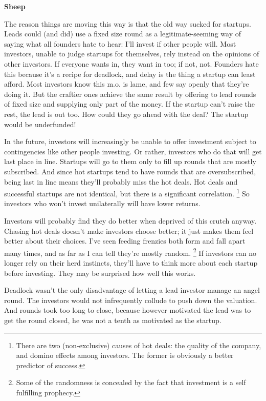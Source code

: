 \textbf{Sheep}

The reason things are moving this way is that the old way sucked for
startups. Leads could (and did) use a fixed size round as a
legitimate-seeming way of saying what all founders hate to hear: I'll
invest if other people will. Most investors, unable to judge startups
for themselves, rely instead on the opinions of other investors. If
everyone wants in, they want in too; if not, not. Founders hate this
because it's a recipe for deadlock, and delay is the thing a startup can
least afford. Most investors know this m.o. is lame, and few say openly
that they're doing it. But the craftier ones achieve the same result by
offering to lead rounds of fixed size and supplying only part of the
money. If the startup can't raise the rest, the lead is out too. How
could they go ahead with the deal? The startup would be underfunded!

In the future, investors will increasingly be unable to offer investment
subject to contingencies like other people investing. Or rather,
investors who do that will get last place in line. Startups will go to
them only to fill up rounds that are mostly subscribed. And since hot
startups tend to have rounds that are oversubscribed, being last in line
means they'll probably miss the hot deals. Hot deals and successful
startups are not identical, but there is a significant correlation.
\footnote{There are two (non-exclusive) causes of hot deals: the quality
of the company, and domino effects among investors. The former is
obviously a better predictor of success.} So investors who won't invest unilaterally will
have lower returns.

Investors will probably find they do better when deprived of this crutch
anyway. Chasing hot deals doesn't make investors choose better; it just
makes them feel better about their choices. I've seen feeding frenzies
both form and fall apart many times, and as far as I can tell they're
mostly random. \footnote{Some of the randomness is concealed by the fact that investment
is a self fulfilling prophecy.} If investors can no longer rely
on their herd instincts, they'll have to think more about each startup
before investing. They may be surprised how well this works.

Deadlock wasn't the only disadvantage of letting a lead investor manage
an angel round. The investors would not infrequently collude to push
down the valuation. And rounds took too long to close, because however
motivated the lead was to get the round closed, he was not a tenth as
motivated as the startup.


